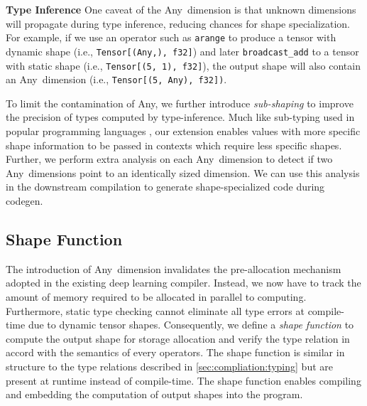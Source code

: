 \noindent
{\bf Type Inference} One caveat of the Any~dimension is that unknown dimensions will propagate during type inference, reducing chances for shape specialization.
For example, if we use an operator such as {\tt arange} to produce a tensor with dynamic shape (i.e., \texttt{Tensor[(Any,), f32]}) and later {\tt broadcast\_add} to a tensor with static shape (i.e., \texttt{Tensor[(5, 1), f32]}), the output shape will also contain an Any~dimension (i.e., \texttt{Tensor[(5, Any), f32])}.

To limit the contamination of Any, we further introduce {\em sub-shaping} to improve the precision of types computed by type-inference.
Much like sub-typing used in popular programming languages \citep{LiskovTPLS1994,AmadioAmadioTPLS1993}, our extension enables values with more specific shape information to be passed in contexts which require less specific shapes.
Further, we perform extra analysis on each Any~dimension to detect if two Any~dimensions point to an identically sized dimension. We can use this analysis in the downstream compilation to generate shape-specialized code during codegen.

\subsection{Shape Function}
\label{sec:compilation:shape-func}
The introduction of Any~dimension invalidates the pre-allocation mechanism adopted in the existing deep learning compiler.
Instead, we now have to track the amount of memory required to be allocated in parallel to computing.
Furthermore, static type checking cannot eliminate all type errors at compile-time due to dynamic tensor shapes.
Consequently, we define a {\em shape function} to compute the output shape for storage allocation and verify the type relation in accord with the semantics of every operators.
The shape function is similar in structure to the type relations described in \autoref{sec:compliation:typing} but are present at runtime instead of compile-time.
The shape function enables compiling and embedding the computation of output shapes into the program.

